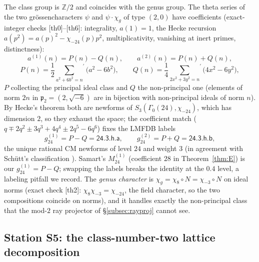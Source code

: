 \documentclass[11pt]{article}
\newcommand{\Zz}{\mathbb{Z}}
\theoremstyle{definition}
\theoremstyle{remark}
\begin{document}
The class group is $\Zz/2$ and coincides with the genus group. The
theta series of the two gr\"ossencharacters $\psi$ and
$\psi\cdot\chi_g$ of type $(2,0)$ have coefficients (exact-integer
checks [th0]--[th6]: integrality, $a(1)=1$, the Hecke recursion
$a(p^2)=a(p)^2-\chi_{-24}(p)p^2$, multiplicativity, vanishing at
inert primes, distinctness):
\[
  a^{(1)}(n)=P(n)-Q(n),\qquad a^{(2)}(n)=P(n)+Q(n),
\]
\[
  P(n)=\frac12{\sum_{a^2+6b^2=n}}^{\!\prime}\bigl(a^2-6b^2\bigr),
  \qquad
  Q(n)=\frac14{\sum_{2x^2+3y^2=n}}^{\!\prime}\bigl(4x^2-6y^2\bigr),
\]
$P$ collecting the principal ideal class and $Q$ the non-principal
one (elements of norm $2n$ in $\mathfrak p_2=(2,\sqrt{-6})$ are in
bijection with non-principal ideals of norm $n$). By Hecke's theorem
\cite{Miyake} both are newforms of $S_3(\Gamma_0(24),\chi_{-24})$,
which has dimension $2$, so they exhaust the space; the coefficient
match ($q\mp2q^2\pm3q^3+4q^4\pm2q^5-6q^6$) fixes the LMFDB labels
\[
  g_{24}^{(1)}=P-Q=\textsf{24.3.h.a},\qquad
  g_{24}^{(2)}=P+Q=\textsf{24.3.h.b},
\]
the unique rational CM newforms of level $24$ and weight $3$
\cite{LMFDB} (in agreement with Sch\"utt's classification \cite{Sch}).
Samart's $M_{24}^{(1)}$ (coefficient $28$ in
Theorem~\ref{thm:E}) is our $g_{24}^{(1)}=P-Q$; swapping the labels
breaks the identity at the $0.4$ level, a labeling pitfall we record.
The \emph{genus character} is
$\chi_g=\chi_8\circ N=\chi_{-3}\circ N$ on ideal norms (exact check
[th2]: $\chi_8\chi_{-3}=\chi_{-24}$, the field character, so the two
compositions coincide on norms), and it handles exactly the
non-principal class that the mod-$2$ ray projector of
\S\ref{subsec:rayproj} cannot see.

\subsection{Station S5: the class-number-two lattice decomposition}
\label{subsec:class2}
\end{document}
